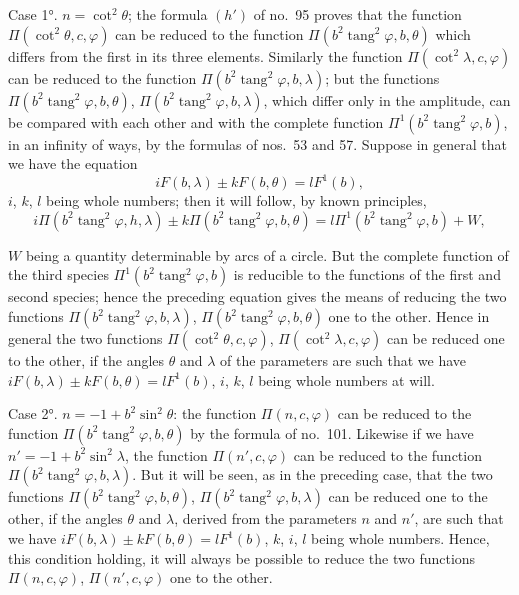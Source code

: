 \documentclass{article}
\begin{document}
Case 1°. $n=\cot^{2}\theta$; the formula $(h')$ of no.\ 95 proves that the function $\Pi(\cot^{2}\theta,c,\varphi)$ can be reduced to the function $\Pi(b^{2}\operatorname{tang}^{2}\varphi,b,\theta)$ which differs from the first in its three elements. Similarly the function $\Pi(\cot^{2}\lambda,c,\varphi)$ can be reduced to the function $\Pi(b^{2}\operatorname{tang}^{2}\varphi,b,\lambda)$; but the functions $\Pi(b^{2}\operatorname{tang}^{2}\varphi,b,\theta)$, $\Pi(b^{2}\operatorname{tang}^{2}\varphi,b,\lambda)$, which differ only in the amplitude, can be compared with each other and with the complete function $\Pi^{1}(b^{2}\operatorname{tang}^{2}\varphi,b)$, in an infinity of ways, by the formulas of nos.\ 53 and 57. Suppose in general that we have the equation
\[ iF(b,\lambda)\pm kF(b,\theta)=lF^{1}(b), \]
$i$, $k$, $l$ being whole numbers; then it will follow, by known principles,
\[ i\Pi(b^{2}\operatorname{tang}^{2}\varphi,h,\lambda)\pm k\Pi(b^{2}\operatorname{tang}^{2}\varphi,b,\theta)=l\Pi^{1}(b^{2}\operatorname{tang}^{2}\varphi,b)+W, \]

$W$ being a quantity determinable by arcs of a circle. But the complete function of the third species $\Pi^{1}(b^{2}\operatorname{tang}^{2}\varphi,b)$ is reducible to the functions of the first and second species; hence the preceding equation gives the means of reducing the two functions $\Pi(b^{2}\operatorname{tang}^{2}\varphi,b,\lambda)$, $\Pi(b^{2}\operatorname{tang}^{2}\varphi,b,\theta)$ one to the other. Hence in general the two functions $\Pi(\cot^{2}\theta,c,\varphi)$, $\Pi(\cot^{2}\lambda,c,\varphi)$ can be reduced one to the other, if the angles $\theta$ and $\lambda$ of the parameters are such that we have $iF(b,\lambda)\pm kF(b,\theta)=lF^{1}(b)$, $i$, $k$, $l$ being whole numbers at will.

Case 2°. $n=-1+b^{2}\sin^{2}\theta$: the function $\Pi(n,c,\varphi)$ can be reduced to the function $\Pi(b^{2}\operatorname{tang}^{2}\varphi,b,\theta)$ by the formula of no.\ 101. Likewise if we have $n'=-1+b^{2}\sin^{2}\lambda$, the function $\Pi(n',c,\varphi)$ can be reduced to the function $\Pi(b^{2}\operatorname{tang}^{2}\varphi,b,\lambda)$. But it will be seen, as in the preceding case, that the two functions $\Pi(b^{2}\operatorname{tang}^{2}\varphi,b,\theta)$, $\Pi(b^{2}\operatorname{tang}^{2}\varphi,b,\lambda)$ can be reduced one to the other, if the angles $\theta$ and $\lambda$, derived from the parameters $n$ and $n'$, are such that we have $iF(b,\lambda)\pm kF(b,\theta)=lF^{1}(b)$, $k$, $i$, $l$ being whole numbers. Hence, this condition holding, it will always be possible to reduce the two functions $\Pi(n,c,\varphi)$, $\Pi(n',c,\varphi)$ one to the other.
\end{document}
